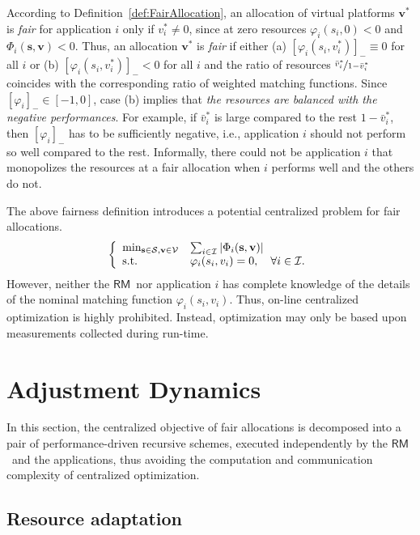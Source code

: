 \documentclass[letter,11pt]{article}
\begin{document}
According to Definition~\ref{def:FairAllocation}, an allocation of virtual platforms ${\mathbf{v}}^*$ is \emph{fair} for application $i$ only if $v_i^*\neq{0}$, since at zero resources $\varphi_i(s_i,0)<0$ and $\Phi_i({\mathbf{s}},{\mathbf{v}})<0$. Thus, an allocation ${\mathbf{v}}^*$ is \emph{fair} if either (a) ${[{\varphi_i(s_i,v_i^*)}]_{-}}\equiv{0}$ for all $i$ or (b) ${[{\varphi_i(s_i,v_i^*)}]_{-}}<0$ for all $i$ and the ratio of resources $\nicefrac{{\bar{v}}_i^*}{1-{\bar{v}}_i^*}$ coincides with the corresponding ratio of weighted matching functions. Since ${[{\varphi_i}]_{-}}\in[-1,0]$, case (b) implies that \textit{the resources are balanced with the negative performances}. For example, if ${\bar{v}}_i^*$ is large compared to the rest $1-{\bar{v}}_i^*$, then ${[{\varphi_i}]_{-}}$ has to be sufficiently negative, i.e., application $i$ should not perform so well compared to the rest. Informally, there could not be application $i$ that monopolizes the resources at a fair allocation when $i$ performs well and the others do not. 

The above fairness definition introduces a potential centralized problem for fair allocations.
\begin{eqnarray}
\centering
\left\{\begin{array}{ll}
  \min_{{\mathbf{s}}\in\mathcal{S},{\mathbf{v}}\in{\mathcal{V}}} & \sum_{i\in\mathcal{I}}{\left\vert {\Phi_i({\mathbf{s}},{\mathbf{v}})} \right\vert} \cr
  \mbox{s.t.} & \varphi_i(s_i,v_i) = 0, \quad \forall i\in\mathcal{I}.
\end{array}\right.
\end{eqnarray}
However, neither the {$\mathsf{RM}$}\ nor application $i$ has complete knowledge of the details of the nominal matching function $\varphi_i(s_i,v_i)$. Thus, on-line centralized optimization is highly prohibited. Instead, optimization may only be based upon measurements collected during run-time. 

\section{Adjustment Dynamics}
\label{sec:LearningDynamics}

In this section, the centralized objective of fair allocations is decomposed into a pair of performance-driven recursive schemes, executed independently by the {$\mathsf{RM}$}\ and the applications, thus avoiding the computation and communication complexity of centralized optimization.  

\subsection{Resource adaptation}
\label{sec:LearningDynamicsRM}
\end{document}
